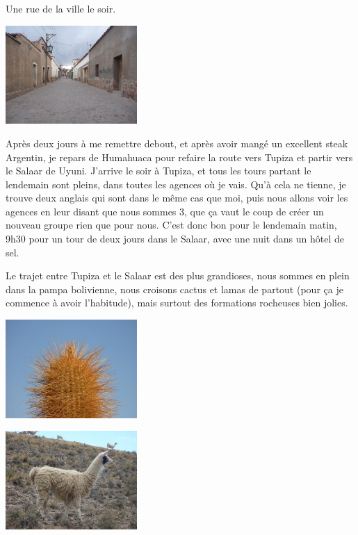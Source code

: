 \begin{multicols}{2}
Une rue de la ville le soir.

\smallbreak
\hspace*{-0.65cm}
\includegraphics[width=5cm]{articles/La-paz-humahuaca-et-salaar/1257387531xqvF.jpg}
\smallbreak

Après deux jours à me remettre debout, et après avoir mangé un excellent steak Argentin, je repars de Humahuaca pour refaire la route vers Tupiza et partir vers le Salaar de Uyuni. J'arrive le soir à Tupiza, et tous les tours partant le lendemain sont pleins, dans toutes les agences où je vais. Qu'à cela ne tienne, je trouve deux anglais qui sont dans le même cas que moi, puis nous allons voir les agences en leur disant que nous sommes 3, que ça vaut le coup de créer un nouveau groupe rien que pour nous. C'est donc bon pour le lendemain matin, 9h30 pour un tour de deux jours dans le Salaar, avec une nuit dans un hôtel de sel.

Le trajet entre Tupiza et le Salaar est des plus grandioses, nous sommes en plein dans la pampa bolivienne, nous croisons cactus et lamas de partout (pour ça je commence à avoir l'habitude), mais surtout des formations rocheuses bien jolies.

\smallbreak
\hspace*{-0.65cm}
\includegraphics[width=5cm]{articles/La-paz-humahuaca-et-salaar/12572037289e7N.jpg}
\smallbreak

\smallbreak
\hspace*{-0.65cm}
\includegraphics[width=5cm]{articles/La-paz-humahuaca-et-salaar/1257387254hVhj.jpg}
\smallbreak


\end{multicols}
